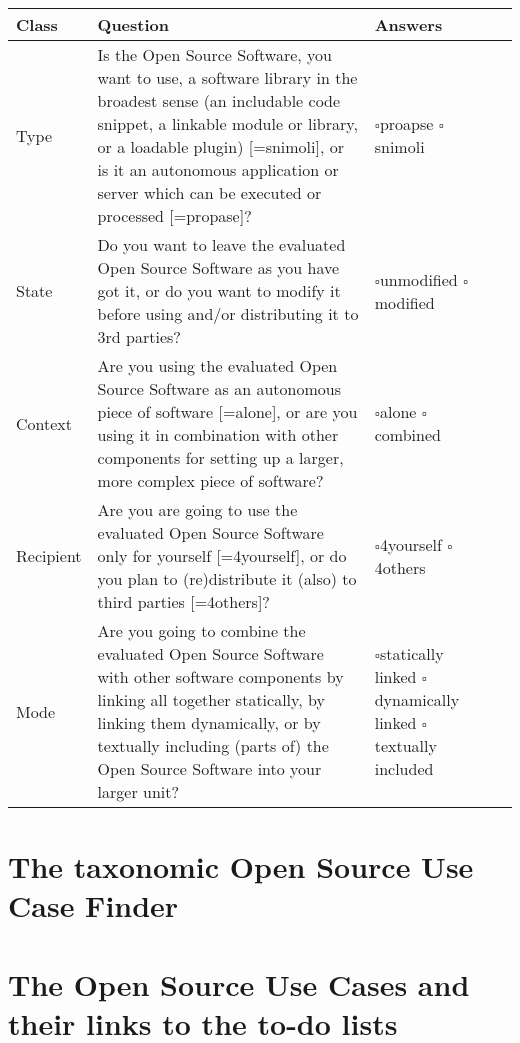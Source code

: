 \begin{tabular}[h]{|l|l|l|l|}
\hline 
Class & Question & Answers\\
\hline 
  Type & 
  \parbox[c][4cm][c]{8cm}{Is the Open Source Software, you want to use, a
  software library in the broadest sense (an includable code snippet, a linkable module or library,
  or a loadable plugin) [=snimoli], or is it an autonomous application or server
  which can be executed or processed [=propase]?} & 
  \parbox{10em}{
    $\square$\hspace{1em}proapse\\
    $\square$\hspace{1em}snimoli}\\
\hline 
  State & 
  \parbox[c][2.5cm][c]{8cm}{Do you want to leave the evaluated Open Source
  Software as you have got it, or do you want to modify it before using and/or distributing it
  to 3rd parties?} &
  \parbox{10em}{
    $\square$\hspace{1em}unmodified\\
    $\square$\hspace{1em}modified} \\
\hline 
  Context & 
  \parbox[c][3cm][c]{8cm}{Are you using the evaluated Open Source Software as
  an autonomous piece of software [=alone], or are you using it in combination with other components
  for setting up a larger, more complex piece of software?} &
  \parbox{10em}{
    $\square$\hspace{1em}alone\\
    $\square$\hspace{1em}combined}\\
\hline 
  Recipient & 
  \parbox[c][3cm][c]{8cm}{Are you are going to use the evaluated Open Source
  Software only for yourself [=4yourself], or do you plan to (re)distribute it (also) to third
  parties [=4others]?}
  & \parbox{10em}{
    $\square$\hspace{1em}4yourself\\
    $\square$\hspace{1em}4others}\\
\hline 
  Mode & 
  \parbox[c][3.4cm][c]{8cm}{Are you going to combine the evaluated Open Source
  Software with other software components by linking all together statically, by linking them
  dynamically, or by textually including (parts of) the Open Source Software
  into your larger unit?} & 
  \parbox{10em}{
    $\square$\hspace{1em}statically linked\\   
    $\square$\hspace{1em}dynamically linked\\
    $\square$\hspace{1em}textually included}\\
\hline 
\hline
\end{tabular}

\section{The taxonomic Open Source Use Case Finder}

\section{The Open Source Use Cases and their links to the to-do lists}

%
